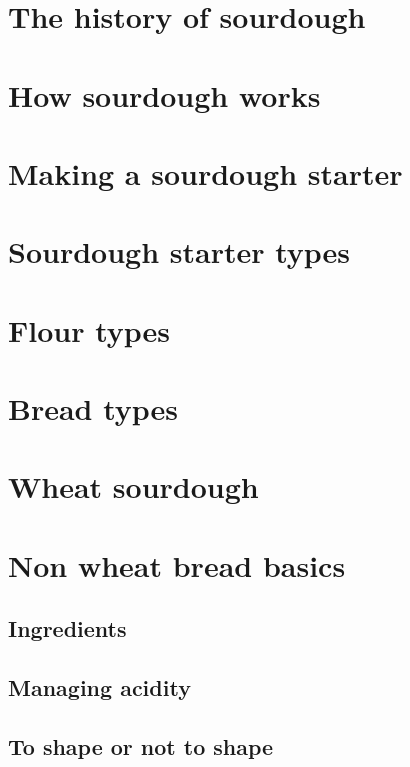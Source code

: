 \documentclass[a4paper, 12pt]{book}
\begin{document}
\mainmatter

\chapter{The history of sourdough}


\chapter{How sourdough works}


\chapter{Making a sourdough starter}


\chapter{Sourdough starter types}


\chapter{Flour types}


\chapter{Bread types}


\chapter{Wheat sourdough}
\label{chapter:wheat-sourdough}


\chapter{Non wheat bread basics}
\label{chapter:non-wheat-sourdough}
\section{Ingredients}
\section{Managing acidity}
\section{To shape or not to shape}
\end{document}
